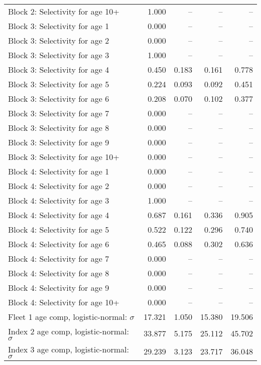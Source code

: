 \documentclass[
]{article}
\begin{document}
\begin{landscape}
\begin{longtable}[t]{lrrrr}
Block 2: Selectivity for age 10+ & 1.000 & -- & -- & --\\
Block 3: Selectivity for age 1 & 0.000 & -- & -- & --\\
Block 3: Selectivity for age 2 & 0.000 & -- & -- & --\\
Block 3: Selectivity for age 3 & 1.000 & -- & -- & --\\
\addlinespace
Block 3: Selectivity for age 4 & 0.450 & 0.183 & 0.161 & 0.778\\
Block 3: Selectivity for age 5 & 0.224 & 0.093 & 0.092 & 0.451\\
Block 3: Selectivity for age 6 & 0.208 & 0.070 & 0.102 & 0.377\\
Block 3: Selectivity for age 7 & 0.000 & -- & -- & --\\
Block 3: Selectivity for age 8 & 0.000 & -- & -- & --\\
\addlinespace
Block 3: Selectivity for age 9 & 0.000 & -- & -- & --\\
Block 3: Selectivity for age 10+ & 0.000 & -- & -- & --\\
Block 4: Selectivity for age 1 & 0.000 & -- & -- & --\\
Block 4: Selectivity for age 2 & 0.000 & -- & -- & --\\
Block 4: Selectivity for age 3 & 1.000 & -- & -- & --\\
\addlinespace
Block 4: Selectivity for age 4 & 0.687 & 0.161 & 0.336 & 0.905\\
Block 4: Selectivity for age 5 & 0.522 & 0.122 & 0.296 & 0.740\\
Block 4: Selectivity for age 6 & 0.465 & 0.088 & 0.302 & 0.636\\
Block 4: Selectivity for age 7 & 0.000 & -- & -- & --\\
Block 4: Selectivity for age 8 & 0.000 & -- & -- & --\\
\addlinespace
Block 4: Selectivity for age 9 & 0.000 & -- & -- & --\\
Block 4: Selectivity for age 10+ & 0.000 & -- & -- & --\\
Fleet 1 age comp, logistic-normal: $\sigma$ & 17.321 & 1.050 & 15.380 & 19.506\\
Index 2 age comp, logistic-normal: $\sigma$ & 33.877 & 5.175 & 25.112 & 45.702\\
Index 3 age comp, logistic-normal: $\sigma$ & 29.239 & 3.123 & 23.717 & 36.048\\*
\end{longtable}
\end{landscape}
\end{document}
